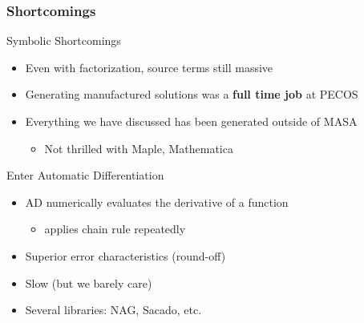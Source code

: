 \documentclass[mathserif]{beamer}
\begin{document}
\begin{frame}
\frametitle{Shortcomings}

\begin{block}{Symbolic Shortcomings}
 \begin{itemize}
  \item Even with factorization, source terms still massive
  \item Generating manufactured solutions was a {\bf full time job} at PECOS
  \item Everything we have discussed has been generated outside of MASA
	\begin{itemize}
	 \item Not thrilled with Maple, Mathematica
	\end{itemize}
 \end{itemize}
\end{block}

 \begin{block}{Enter Automatic Differentiation}
  \begin{itemize}
   \item AD numerically evaluates the derivative of a function 
	\begin{itemize}
	 \item applies chain rule repeatedly 
	\end{itemize}
   \item Superior error characteristics (round-off)
   \item Slow (but we barely care)
   \item Several libraries: NAG, Sacado, etc.
  \end{itemize}
 \end{block}
\end{frame}
\end{document}
